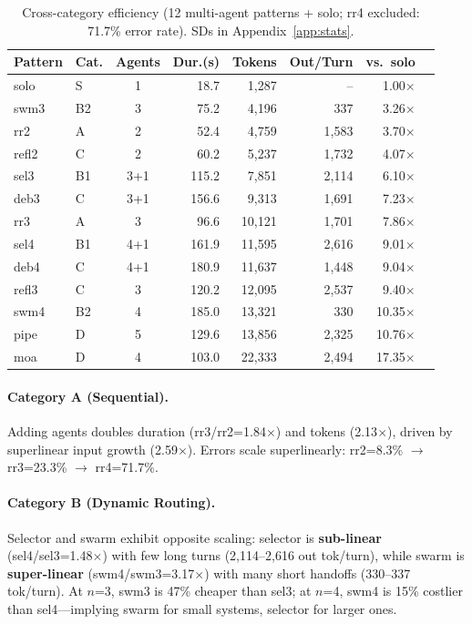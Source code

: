 \documentclass{article}
\begin{document}
\begin{table}[t]
\centering
\caption{Cross-category efficiency (12 multi-agent patterns + solo; rr4 excluded: 71.7\% error rate). SDs in Appendix~\ref{app:stats}.}
\label{tab:cross_category}
{\small
\begin{tabular}{@{}llcrrrrr@{}}
\toprule
\textbf{Pattern} & \textbf{Cat.} & \textbf{Agents} & \textbf{Dur.(s)} & \textbf{Tokens} & \textbf{Out/Turn} & \textbf{vs.\ solo} \\
\midrule
solo & S & 1 & 18.7 & 1,287 & -- & 1.00$\times$ \\
swm3 & B2 & 3 & 75.2 & 4,196 & 337 & 3.26$\times$ \\
rr2 & A & 2 & 52.4 & 4,759 & 1,583 & 3.70$\times$ \\
refl2 & C & 2 & 60.2 & 5,237 & 1,732 & 4.07$\times$ \\
sel3 & B1 & 3+1 & 115.2 & 7,851 & 2,114 & 6.10$\times$ \\
deb3 & C & 3+1 & 156.6 & 9,313 & 1,691 & 7.23$\times$ \\
rr3 & A & 3 & 96.6 & 10,121 & 1,701 & 7.86$\times$ \\
sel4 & B1 & 4+1 & 161.9 & 11,595 & 2,616 & 9.01$\times$ \\
deb4 & C & 4+1 & 180.9 & 11,637 & 1,448 & 9.04$\times$ \\
refl3 & C & 3 & 120.2 & 12,095 & 2,537 & 9.40$\times$ \\
swm4 & B2 & 4 & 185.0 & 13,321 & 330 & 10.35$\times$ \\
pipe & D & 5 & 129.6 & 13,856 & 2,325 & 10.76$\times$ \\
moa & D & 4 & 103.0 & 22,333 & 2,494 & 17.35$\times$ \\
\bottomrule
\end{tabular}
}
\vspace{-1mm}
\end{table}

\paragraph{Category A (Sequential).} Adding agents doubles duration (rr3/rr2=1.84$\times$) and tokens (2.13$\times$), driven by superlinear input growth (2.59$\times$). Errors scale superlinearly: rr2=8.3\% $\to$ rr3=23.3\% $\to$ rr4=71.7\%.

\paragraph{Category B (Dynamic Routing).} Selector and swarm exhibit opposite scaling: selector is \textbf{sub-linear} (sel4/sel3=1.48$\times$) with few long turns (2,114--2,616 out tok/turn), while swarm is \textbf{super-linear} (swm4/swm3=3.17$\times$) with many short handoffs (330--337 tok/turn). At $n$=3, swm3 is 47\% cheaper than sel3; at $n$=4, swm4 is 15\% costlier than sel4---implying swarm for small systems, selector for larger ones.
\end{document}
